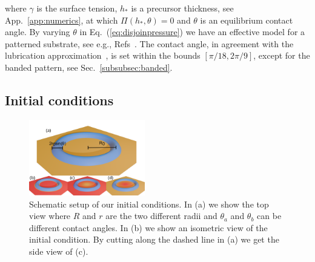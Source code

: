 \documentclass[twoside,twocolumn,9pt]{article}
\begin{document}
where $\gamma$ is the surface tension, $h_{\ast}$ is a precursor thickness, see App.~\ref{app:numerics}, at which $\Pi(h_{\ast}, \theta) = 0$ and $\theta$ is an equilibrium contact angle.
By varying $\theta$ in Eq.~(\ref{eq:disjoinpressure}) we have an effective model for a patterned substrate, see e.g., Refs~\cite{zitzLatticeBoltzmannSimulations2021, zitzControllingDewettingMorphologies2023}. 
The contact angle, in agreement with the lubrication approximation~\cite{oronLongscaleEvolutionThin1997, crasterDynamicsStabilityThin2009}, is set within the bounds $[\pi/18, 2\pi/9]$, except for the banded pattern, see Sec.~\ref{subsubsec:banded}. 

\subsection{Initial conditions}
\begin{figure}
\centering
  \includegraphics[width=0.45\textwidth]{New_fig1.png}
  \caption{Schematic setup of our initial conditions. In (a) we show the top view where $R$ and $r$ are the two different radii and $\theta_a$ and $\theta_b$ can be different contact angles. 
  In (b) we show an isometric view of the initial condition.
  By cutting along the dashed line in (a) we get the side view of (c).}
  \label{fig:ringschema}
\end{figure}
\end{document}
